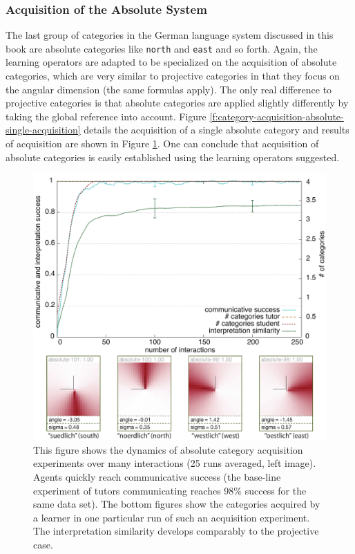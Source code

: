 \subsubsection*{Acquisition of the Absolute System}
The last group of categories in the German language system discussed in this book
are absolute categories like {\footnotesize\tt north} and {\footnotesize\tt east} and so forth. Again,
the learning operators are adapted to be specialized on the acquisition of absolute
categories, which are very similar to projective categories in that they focus on
the angular dimension (the same formulas apply). The only real difference to
projective categories is that absolute categories are applied slightly differently
by taking the global reference into account. Figure 
\ref{f:category-acquisition-absolute-single-acquisition} details the acquisition
of a single absolute category and results of acquisition are shown 
in Figure \ref{f:category-acquisition-absolute-results}. One can conclude that
acquisition of absolute categories is easily established using the 
learning operators suggested.

\begin{figure} 
\begin{center}
\includegraphics[width=1.0\columnwidth]{figs/category-acquisition-absolute-results+categories}
\end{center}
\caption[Results acquisition of the absolute system]{This figure shows the 
dynamics of absolute category acquisition experiments 
over many interactions (25 runs averaged, 
left image). Agents quickly reach communicative success (the base-line experiment 
of tutors communicating reaches 98\% success for the same data set). 
The bottom figures show the categories acquired by a learner in one particular run of such 
an acquisition experiment. The interpretation similarity develops comparably to the projective
case.}
\label{f:category-acquisition-absolute-results}
\end{figure}

